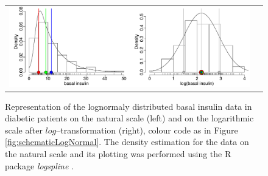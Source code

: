 \begin{figure}[htb!]
\centering
\begin{tabular}{cc}
 \includegraphics[width=160mm]{pics/normalAndLogDomain}
\end{tabular}
\caption{Representation of the lognormaly distributed basal insulin data in diabetic patients 
\cite{Rudenski:1991aa} on the natural scale (left) and on the logarithmic scale after 
$log$--transformation (right), colour code as in Figure \ref{fig:schematicLogNormal}. 
The density estimation for the data on the natural scale and its plotting was performed 
using the R package \textit{logspline} \cite{Kooperberg:2013}.}
\label{fig:insulinData}
\end{figure}

